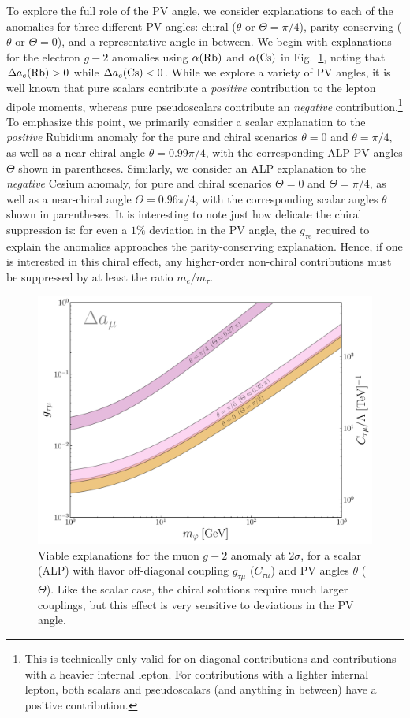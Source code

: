 {\begin{figure}[t!]
    \label{fig:electron_anomaly_explanations}
\end{figure}
To explore the full role of the PV angle, we consider explanations to each of the anomalies for three different PV angles: chiral ($\theta$ or $\Theta = \pi/4$), parity-conserving ($\theta$ or $\Theta = 0$), and a representative angle in between. We begin with explanations for the electron $g-2$ anomalies using $\alpha({\rm Rb})$ and $\alpha({\rm Cs})$ in Fig.~\ref{fig:electron_anomaly_explanations}, noting that $\Delta a_e({\rm Rb}) > 0$ while $\Delta a_e({\rm Cs}) < 0$. While we explore a variety of PV angles, it is well known that pure scalars contribute a {\it positive} contribution to the lepton dipole moments, whereas pure pseudoscalars contribute an {\it negative} contribution.\footnote{This is technically only valid for on-diagonal contributions and contributions with a heavier internal lepton. For contributions with a lighter internal lepton, both scalars and pseudoscalars (and anything in between) have a positive contribution.} To emphasize this point, we primarily consider a scalar explanation to the {\it positive} Rubidium anomaly for the pure and chiral scenarios $\theta = 0$ and $\theta = \pi/4$, as well as a near-chiral angle $\theta = 0.99\pi/4$, with the corresponding ALP PV angles $\Theta$ shown in parentheses. Similarly, we consider an ALP explanation to the {\it negative} Cesium anomaly, for pure and chiral scenarios $\Theta = 0$  and $\Theta = \pi/4$, as well as a near-chiral angle $\Theta = 0.96\pi/4$, with the corresponding scalar angles $\theta$ shown in parentheses. It is interesting to note just how delicate the chiral suppression is: for even a $1\%$ deviation in the PV angle, the $g_{\tau e}$ required to explain the anomalies approaches the parity-conserving explanation. Hence, if one is interested in this chiral effect, any higher-order non-chiral contributions must be suppressed by at least the ratio $m_e/m_\tau$.
\begin{figure}[t!]
    \centering
    \includegraphics[clip,width=0.55\linewidth]{figures/chapter3/scalar_ALP_muon_g_2.pdf}
    \caption[LFV scalar and ALP explanations to muon $g-2$ anomaly.]{Viable explanations for the muon $g-2$ anomaly at $2\sigma$, for a scalar (ALP) with flavor off-diagonal coupling $g_{\tau\mu}$ ($C_{\tau\mu}$) and PV angles $\theta$ ($\Theta$). Like the scalar case, the chiral solutions require much larger couplings, but this effect is very sensitive to deviations in the PV angle.}
    \label{fig:muon_anomaly_explanation}
\end{figure}

}
